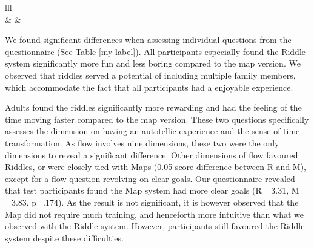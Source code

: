 \begin{table}[h]
\begin{tabular}{lll}
                                                                                                                                                                                                                                         \\ \hline
{}                                                                   &                   &                     \\ \hline
{}                                                                                                                                      
\end{tabular}
\end{table}

We found significant differences when assessing individual questions from the questionnaire (See Table \ref{my-label}). All participants especially found the Riddle system significantly more fun and less boring compared to the map version. We observed that riddles served a potential of including multiple family members, which  accommodate the fact that all participants had a enjoyable experience. 

Adults found the riddles significantly more rewarding and had the feeling of the time moving faster compared to the map version. These two questions specifically assesses the dimension on having an autotellic experience and the sense of time transformation. As flow involves nine dimensions, these two were the only dimensions to reveal a significant difference. Other dimensions of flow favoured Riddles, or were closely tied with Maps (0.05 score difference between R and M), except for a flow question revolving on clear goals. Our questionnaire revealed that test participants found the Map system had more clear goals (R =3.31, M =3.83, p=.174). As the result is not significant, it is however observed that the Map did not require much training, and henceforth more intuitive than what we observed with the Riddle system. However, participants still favoured the Riddle system despite these difficulties. 

